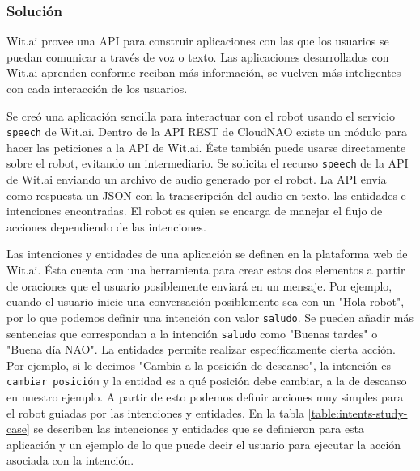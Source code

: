 \subsubsection{Solución}

Wit.ai provee una API para construir aplicaciones
con las que los usuarios se puedan comunicar a través de voz o texto.
Las aplicaciones desarrollados con Wit.ai aprenden conforme reciban más 
información, se vuelven más inteligentes con cada interacción de los usuarios.

Se creó una aplicación sencilla
para interactuar con el robot usando el servicio \texttt{speech} de
Wit.ai.
Dentro de la API REST de CloudNAO existe un módulo para hacer las peticiones
a la API de Wit.ai. Éste también puede usarse directamente sobre
el robot, evitando un intermediario.
Se solicita el recurso \texttt{speech} de la API de Wit.ai 
enviando
un archivo de audio generado por el robot. La API
envía como respuesta un JSON con la transcripción del audio 
en texto, las entidades e intenciones encontradas.
El robot es quien se encarga de manejar el flujo de
acciones dependiendo de las intenciones.

Las intenciones y entidades de una aplicación se definen en la plataforma
web de Wit.ai. Ésta cuenta con una herramienta para
crear estos dos elementos a partir de oraciones que el usuario
posiblemente enviará en un mensaje. Por ejemplo,
cuando el usuario inicie una conversación posiblemente
sea con un "Hola robot", por lo que podemos definir una
intención con valor \texttt{saludo}.
Se pueden añadir más sentencias
que correspondan a la intención \texttt{saludo}
como "Buenas tardes" o
"Buena día NAO".
La entidades permite realizar específicamente cierta acción.
Por ejemplo, si le decimos "Cambia a la posición de descanso", la intención es \texttt{cambiar posición} y la
entidad es a qué posición debe cambiar, a la de descanso
en nuestro ejemplo.
A partir de esto podemos definir acciones muy simples
para el robot guiadas por las intenciones y entidades. En la tabla \ref{table:intents-study-case} se describen las intenciones y entidades que se
definieron para esta aplicación
y un ejemplo de lo que puede decir el usuario para ejecutar la acción asociada con la intención.

